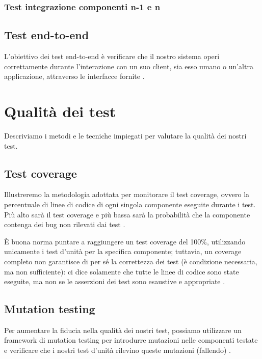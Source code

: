 \subsubsection{Test integrazione componenti n-1 e n}

\subsection{Test end-to-end}

L'obiettivo dei test end-to-end è verificare che il nostro sistema operi correttamente durante l'interazione con un suo client, sia esso umano o un'altra applicazione, attraverso le interfacce fornite \cite{bettini2021tdd}.

\section{Qualit\`a dei test}

Descriviamo i metodi e le tecniche impiegati per valutare la qualità dei nostri test.

\subsection{Test coverage}

Illustreremo la metodologia adottata per monitorare il test coverage, ovvero la percentuale di linee di codice di ogni singola componente eseguite durante i test. Più alto sarà il test coverage e più bassa sarà la probabilità che la componente contenga dei bug non rilevati dai test \cite{bettini2021tdd}.

\medskip

È buona norma puntare a raggiungere un test coverage del 100\%, utilizzando unicamente i test d'unità per la specifica componente; tuttavia, un coverage completo non garantisce di per sé la correttezza dei test (è condizione necessaria, ma non sufficiente): ci dice solamente che tutte le linee di codice sono state eseguite, ma non se le asserzioni dei test sono esaustive e appropriate \cite{bettini2021tdd}.

\subsection{Mutation testing}

Per aumentare la fiducia nella qualità dei nostri test, possiamo utilizzare un framework di mutation testing per introdurre mutazioni nelle componenti testate e verificare che i nostri test d'unità rilevino queste mutazioni (fallendo) \cite{bettini2021tdd}.

